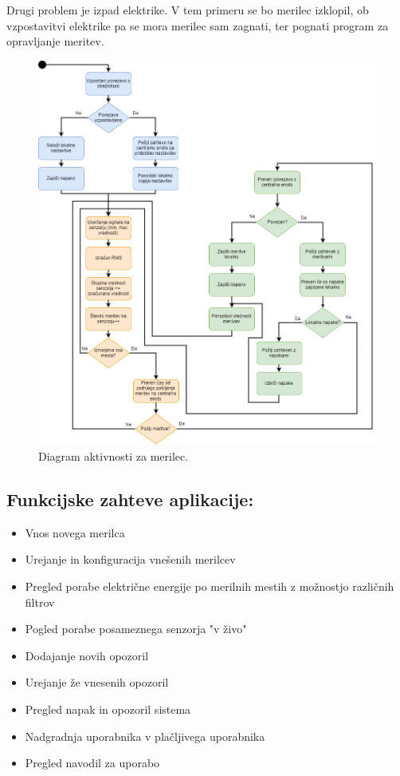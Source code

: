 \documentclass[12pt,a4paper,titlepage,openany]{report}
\begin{document}
Drugi problem je izpad elektrike. V tem primeru se bo merilec izklopil, ob vzpostavitvi elektrike pa se mora merilec sam zagnati, ter pognati program za opravljanje meritev.


\begin{figure}[H]
\begin{center}
\includegraphics[width=1\linewidth]{Slike/ActivityMerilec.png}
\end{center}
\caption{Diagram aktivnosti za merilec.}\label{slika:ActivityMerilec}
\end{figure}

\newpage
\subsection{Funkcijske zahteve aplikacije:}



\begin{itemize}
\item Vnos novega merilca
\item Urejanje in konfiguracija vnešenih merilcev
\item Pregled porabe električne energije po merilnih mestih z možnostjo različnih filtrov
\item Pogled porabe posameznega senzorja "v živo"
\item Dodajanje novih opozoril
\item Urejanje že vnesenih opozoril
\item Pregled napak in opozoril sistema
\item Nadgradnja uporabnika v plačljivega uporabnika
\item Pregled navodil za uporabo
\end{itemize}
\end{document}
